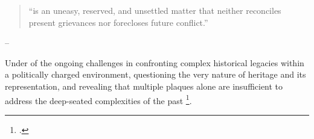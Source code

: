 \documentclass{scrartcl}
\renewcommand{\cite}{\parencite}
\begin{document}
\begin{quotation}
    ``is an uneasy, reserved, and unsettled matter that neither reconciles present grievances nor forecloses future conflict.''
\end{quotation}
\begin{flushright}
    -- \cite[][p.3]{eve_tuck_k_wayne_yang_decolonization_2012}
\end{flushright}

Under of the ongoing challenges in confronting complex historical legacies within a politically charged environment, questioning the very nature of heritage and its representation, and revealing that multiple plaques alone are insufficient to address the deep-seated complexities of the past \footcite[``We, at least in part, want others to join us in these efforts, so that settler colonial structuring and Indigenous critiques of that structuring are no longer rendered invisible. Yet, this joining cannot be too easy, too open, too settled. Solidarity is an uneasy, reserved, and unsettled matter that neither reconciles present grievances nor forecloses future conflict. There are parts of the decolonisation project that are not easily absorbed by human rights or civil rights based approaches to educational equity.''][p.3]{eve_tuck_k_wayne_yang_decolonization_2012}.


\clearpage

\printbibliography

\clearpage
\end{document}
